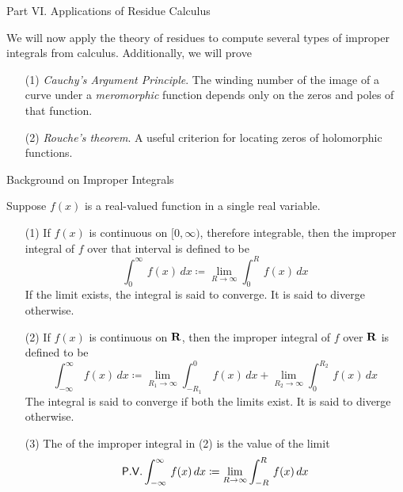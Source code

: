 \vspace*{1em}

\begin{mdframed}[backgroundcolor=paleyellow,linewidth=1pt]
\begin{center}
{\sc\Large Part VI. Applications of Residue Calculus}
\end{center}
\end{mdframed}

\begin{discussion}
We will now apply the theory of residues to compute several types of improper integrals from calculus. Additionally, we will prove
\begin{itemize}
\item[(1)] \emph{Cauchy's Argument Principle}. The winding number of the image of a curve under a \emph{meromorphic} function depends only on the zeros and poles of that function.
\item[(2)] \emph{Rouche's theorem}. A useful criterion for locating zeros of holomorphic functions. 
\end{itemize}
\end{discussion}

\vspace*{2em}

\begin{mdframed}
\begin{center}
{\Large Background on Improper Integrals}
\end{center}
\end{mdframed}

\begin{definition}
Suppose $f(x)$ is a real-valued function in a single real variable.
\begin{itemize}
\item[(1)] If $f(x)$ is continuous on $[0,\infty)$, therefore integrable, then the improper integral of $f$ over that interval is defined to be
\[\int_0^\infty\,f(x)\,dx \coloneqq \lim_{R \to \infty}\int_0^R\,f(x)\,dx\]
If the limit exists, the integral is said to converge. It is said to diverge otherwise.

\item[(2)] If $f(x)$ is continuous on $\mathbf R$, then the improper integral of $f$ over $\mathbf R$ is defined to be
\[\int_{-\infty}^\infty\,f(x)\,dx \coloneqq \lim_{R_1 \to \infty}\int^0_{-R_1}\,f(x)\,dx + \lim_{R_2 \to \infty}\int_0^{R_2}\,f(x)\,dx\]
The integral is said to converge if both the limits exist. It is said to diverge otherwise.

\item[(3)] The  of the improper integral in (2) is the value of the limit
\[\mathsf{P.V.}\int_{-\infty}^\infty\,f(x)\,dx \coloneqq \lim_{R \to \infty}\int^R_{-R}\,f(x)\,dx\]
\end{itemize}
\end{definition}

